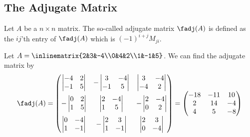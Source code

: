 \subsection{The Adjugate Matrix}\label{subsec-adjugate-matrices}

\begin{definition}
	Let $A$ be a $n \times n$ matrix. The so-called adjugate matrix $\fadj(A)$
	is defined as the $ij$'th entry of $\fadj(A)$ which is $(-1)^{i+j}M_{ji}$.
\end{definition}

\begin{exm}\label{exm-finding-adj}
	Let $A=\inlinematrix{2&3&-4\\0&4&2\\1&-1&5}$. We can find the adjugate matrix by
	\begin{equation*}
		\fadj(A)=\begin{pmatrix}
			\begin{vmatrix}
				-4 & 2 \\
				-1 & 5
			\end{vmatrix}  &
			-\begin{vmatrix}
				3  & -4 \\
				-1 & 5
			\end{vmatrix} &
			\begin{vmatrix}
				3  & -4 \\
				-4 & 2
			\end{vmatrix}    \\[12pt]
			-\begin{vmatrix}
				0 & 2 \\
				1 & 5
			\end{vmatrix} &
			\begin{vmatrix}
				2 & -4 \\
				1 & 5
			\end{vmatrix}  &
			-\begin{vmatrix}
				2 & -4 \\
				0 & 2
			\end{vmatrix}   \\[12pt]
			\begin{vmatrix}
				0 & -4 \\
				1 & -1
			\end{vmatrix}  &
			-\begin{vmatrix}
				2 & 3  \\
				1 & -1
			\end{vmatrix} &
			\begin{vmatrix}
				2 & 3  \\
				0 & -4
			\end{vmatrix}
		\end{pmatrix}=
		\begin{pmatrix}
			-18 & -11 & 10 \\
			2   & 14  & -4 \\
			4   & 5   & -8
		\end{pmatrix}
	\end{equation*}
\end{exm}

